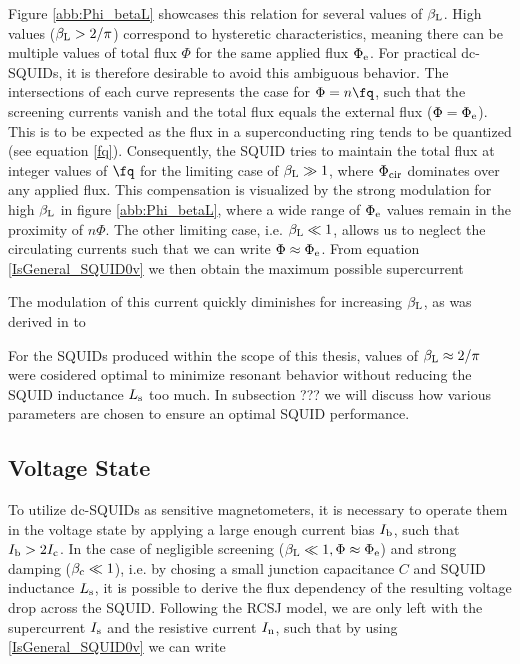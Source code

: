 Figure \ref{abb:Phi_betaL} showcases this relation for several values of $\beta_{\rm L}$. High values ($\beta_{\rm L}>2/\pi$) correspond to  hysteretic characteristics, meaning there can be multiple values of total flux $\Phi$ for the same applied flux $\Phi_{\rm e}$. For practical dc-SQUIDs, it is therefore desirable to avoid this ambiguous behavior. The intersections of each curve represents the case for $\Phi = n\unit{\fq}$, such that the screening currents vanish and the total flux equals the external flux ($\Phi=\Phi_{\rm e}$). This is to be expected as the flux in a superconducting ring tends to be quantized (see equation \ref{fq}). Consequently, the SQUID tries to maintain the total flux at integer values of $\unit{\fq}$ for the limiting case of $\beta_{\rm L}\gg 1$, where $\Phi_{\rm cir}$ dominates over any applied flux. This compensation is visualized by the strong modulation for high $\beta_{\rm L}$ in figure \ref{abb:Phi_betaL}, where a wide range of $\Phi_{\rm e}$ values remain in the proximity of $n\Phi$. The other limiting case, i.e. $\beta_{\rm L}\ll 1$, allows us to neglect the circulating currents such that we can write $\Phi \approx \Phi_{\rm e}$. From equation \ref{IsGeneral_SQUID0v} we then obtain the maximum possible supercurrent 


The modulation of this current quickly diminishes for increasing $\beta_{\rm L}$, as was derived in \cite{Clarke2004} to 


For the SQUIDs produced within the scope of this thesis, values of $\beta_{\rm L}\approx 2/\pi$ were cosidered optimal to minimize resonant behavior without reducing the SQUID inductance $L_{\rm s}$ too much. In subsection ??? we will discuss how various parameters are chosen to ensure an optimal SQUID performance.

\subsection{Voltage State}

To utilize dc-SQUIDs as sensitive magnetometers, it is necessary to operate them in the voltage state by applying a large enough current bias $I_{\rm b}$, such that $I_{\rm b}>2I_{\rm c}$. In the case of negligible screening ($\beta_{\rm L}\ll 1, \Phi\approx\Phi_{\rm e}$) and strong damping ($\beta_{\rm c}\ll 1$), i.e. by chosing a small junction capacitance $C$ and SQUID inductance $L_{\rm s}$, it is possible to derive the flux dependency of the resulting voltage drop across the SQUID. Following the RCSJ model, we are only left with the supercurrent $I_{\rm s}$ and the resistive current $I_{\rm n}$, such that by using \ref{IsGeneral_SQUID0v} we can write 

